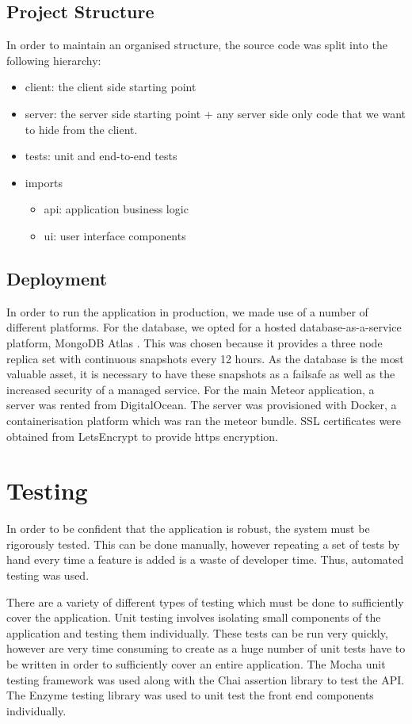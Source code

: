 \documentclass[12pt]{article}
\begin{document}
\subsection{Project Structure}
In order to maintain an organised structure, the source code was split into the following hierarchy:
\begin{itemize}
    \item client: the client side starting point
    \item server: the server side starting point + any server side only code that we want to hide from the client.
    \item tests: unit and end-to-end tests
    \item imports \begin{itemize}
              \item api: application business logic
              \item ui: user interface components
          \end{itemize}
\end{itemize}

\subsection{Deployment}
In order to run the application in production, we made use of a number of different platforms. For the database, we opted for a hosted database-as-a-service platform, MongoDB Atlas \cite{mongodb_atlas}. This was chosen because it provides a three node replica set with continuous snapshots every 12 hours. As the database is the most valuable asset, it is necessary to have these snapshots as a failsafe as well as the increased security of a managed service.
For the main Meteor application, a server was rented from DigitalOcean\cite{digitalocean}. The server was provisioned with Docker, a containerisation platform which was ran the meteor bundle. SSL certificates were obtained from LetsEncrypt to provide https encryption.

\section{Testing}
In order to be confident that the application is robust, the system must be rigorously tested. This can be done manually, however repeating a set of tests by hand every time a feature is added is a waste of developer time. Thus, automated testing was used.

There are a variety of different types of testing which must be done to sufficiently cover the application. Unit testing involves isolating small components of the application and testing them individually. These tests can be run very quickly, however are very time consuming to create as a huge number of unit tests have to be written in order to sufficiently cover an entire application. The Mocha unit testing framework \cite{mocha} was used along with the Chai \cite{chai} assertion library to test the API. The Enzyme testing library was used to unit test the front end components individually.
\end{document}
